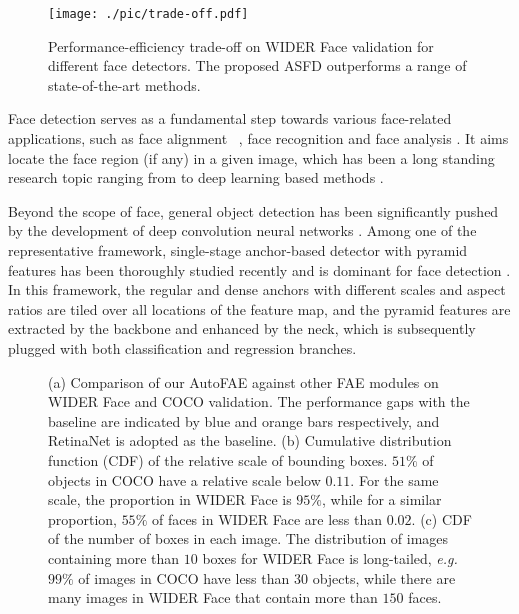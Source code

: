 \documentclass[sigconf]{acmart}
\begin{document}
\begin{figure}
    \centering
    \texttt{[image: ./pic/trade-off.pdf]}
    \caption{Performance-efficiency trade-off on WIDER Face validation for different face detectors. The proposed ASFD outperforms a range of state-of-the-art methods.}
    \label{fig:trade_off}
\end{figure}

Face detection serves as a fundamental step towards various face-related applications, such as face alignment ~\cite{tai2019towards}, face recognition \cite{huang2020curricularface} and face analysis \cite{pan2018mean}. It aims locate the face region (if any) in a given image, which has been a long standing research topic ranging from \cite{viola2004robust} to deep learning based methods \cite{zhang2017s3fd,chi2019srn}.

Beyond the scope of face, general object detection has been significantly pushed by the development of deep convolution neural networks \cite{simonyan2014vgg,he2016resnet,ren2015faster,liu2016ssd}. Among one of the representative framework, single-stage anchor-based detector with pyramid features has been thoroughly studied recently \cite{liu2016ssd,lin2017focal} and is dominant for face detection \cite{zhang2017s3fd,chi2019selective,tang2018pyramidbox,li2019dsfd,zhang2020refineface}. In this framework, the regular and dense anchors with different scales and aspect ratios are tiled over all locations of the feature map, and the pyramid features are extracted by the backbone and enhanced by the neck, which is subsequently plugged with both classification and regression branches.


\begin{figure*}[!t]
    \centering
    \caption{(a) Comparison of our AutoFAE against other FAE modules on WIDER Face and COCO validation. The performance gaps with the baseline are indicated by blue and orange bars respectively, and RetinaNet is adopted as the baseline.
    (b) Cumulative distribution function (CDF) of the relative scale of bounding boxes. $51\%$ of objects in COCO have a relative scale below $0.11$. For the same scale, the proportion in WIDER Face is $95\%$, while for a similar proportion, $55\%$ of faces in WIDER Face are less than $0.02$.
    (c) CDF of the number of boxes in each image. The distribution of images containing more than $10$ boxes for WIDER Face is long-tailed, \textit{e.g.} $99\%$ of images in COCO have less than $30$ objects, while there are many images in WIDER Face that contain more than $150$ faces.
    }
    \label{fig:gap_coco_widerface}
\end{figure*}
\end{document}
